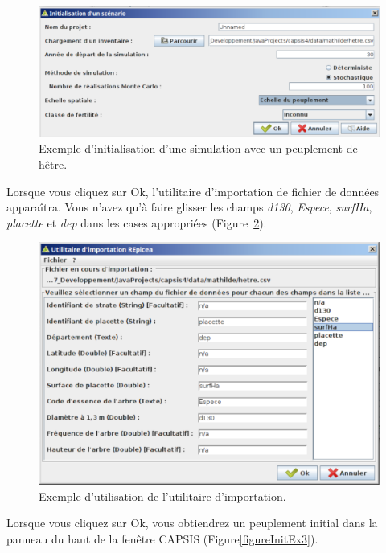\documentclass[a4paper,12pt]{article}
\begin{document}
\begin{figure}[!h]
\begin{center}
\includegraphics[width=\textwidth]{./figures/initializationExample1}
\caption{Exemple d'initialisation d'une simulation avec un peuplement de hêtre.}
\label{figureInitEx1}
\end{center}
\end{figure}

Lorsque vous cliquez sur Ok, l'utilitaire d'importation de fichier de données apparaîtra. Vous n'avez qu'à faire glisser les champs \textit{d130}, \textit{Espece}, \textit{surfHa}, \textit{placette} et \textit{dep} dans les cases appropriées (Figure~\ref{figureInitEx2}).

\begin{figure}[!h]
\begin{center}
\includegraphics[width=\textwidth]{./figures/initializationExample2}
\caption{Exemple d'utilisation de l'utilitaire d'importation.}
\label{figureInitEx2}
\end{center}
\end{figure}

Lorsque vous cliquez sur Ok, vous obtiendrez un peuplement initial dans la panneau du haut de la fenêtre CAPSIS (Figure\ref{figureInitEx3}).
\end{document}
